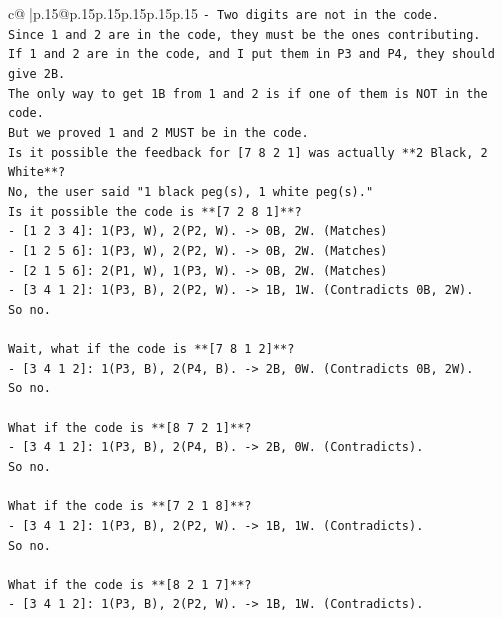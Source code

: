 \documentclass{article}
\begin{document}
{\begin{supertabular}{c@{$\;$}|p{.15\linewidth}@{}p{.15\linewidth}p{.15\linewidth}p{.15\linewidth}p{.15\linewidth}p{.15\linewidth}}
{{{\texttt{{-} Two digits are not in the code.} \\
\texttt{Since 1 and 2 are in the code, they must be the ones contributing.} \\
\texttt{If 1 and 2 are in the code, and I put them in P3 and P4, they should give 2B.} \\
\texttt{The only way to get 1B from 1 and 2 is if one of them is NOT in the code.} \\
\texttt{But we proved 1 and 2 MUST be in the code.} \\
\texttt{Is it possible the feedback for {[}7 8 2 1{]} was actually **2 Black, 2 White**?} \\
\texttt{No, the user said "1 black peg(s), 1 white peg(s)."} \\
\texttt{Is it possible the code is **{[}7 2 8 1{]}**?} \\
\texttt{{-} {[}1 2 3 4{]}: 1(P3, W), 2(P2, W). {-}> 0B, 2W. (Matches)} \\
\texttt{{-} {[}1 2 5 6{]}: 1(P3, W), 2(P2, W). {-}> 0B, 2W. (Matches)} \\
\texttt{{-} {[}2 1 5 6{]}: 2(P1, W), 1(P3, W). {-}> 0B, 2W. (Matches)} \\
\texttt{{-} {[}3 4 1 2{]}: 1(P3, B), 2(P2, W). {-}> 1B, 1W. (Contradicts 0B, 2W).} \\
\texttt{So no.} \\
\\ 
\texttt{Wait, what if the code is **{[}7 8 1 2{]}**?} \\
\texttt{{-} {[}3 4 1 2{]}: 1(P3, B), 2(P4, B). {-}> 2B, 0W. (Contradicts 0B, 2W).} \\
\texttt{So no.} \\
\\ 
\texttt{What if the code is **{[}8 7 2 1{]}**?} \\
\texttt{{-} {[}3 4 1 2{]}: 1(P3, B), 2(P4, B). {-}> 2B, 0W. (Contradicts).} \\
\texttt{So no.} \\
\\ 
\texttt{What if the code is **{[}7 2 1 8{]}**?} \\
\texttt{{-} {[}3 4 1 2{]}: 1(P3, B), 2(P2, W). {-}> 1B, 1W. (Contradicts).} \\
\texttt{So no.} \\
\\ 
\texttt{What if the code is **{[}8 2 1 7{]}**?} \\
\texttt{{-} {[}3 4 1 2{]}: 1(P3, B), 2(P2, W). {-}> 1B, 1W. (Contradicts).} \\
}}}
\end{supertabular}}
\end{document}
